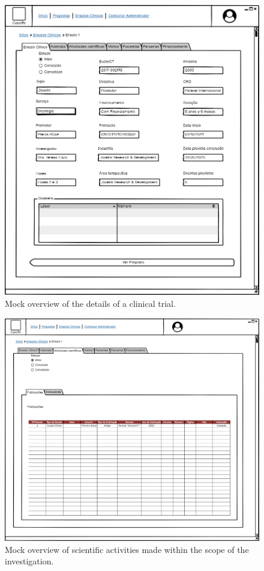 \begin{figure}[H]
    \centering
    \includegraphics[scale=0.35]{Chapters/img/ensaios/ensaio-detalhe.png}
    \caption{Mock overview of the details of a clinical trial.}
    \label{fig:enasio-detalhe}
\end{figure}


\begin{figure}[H]
    \centering
    \includegraphics[scale=0.35]{Chapters/img/ensaios/ensaio-atividades-cientificas.png}
    \caption{Mock overview of scientific activities made within the scope of the investigation.}
    \label{fig:ensaio-atividades-cientificas}
\end{figure}


